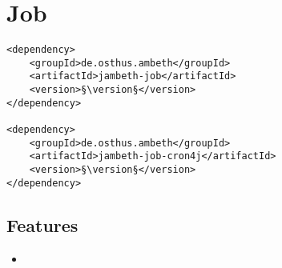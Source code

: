 \section{Job}
\label{module:Job}
\ClearAPI
\TODO
\begin{lstlisting}[style=POM,caption={Maven modules to use \emph{Ambeth Job}}]
<dependency>
	<groupId>de.osthus.ambeth</groupId>
	<artifactId>jambeth-job</artifactId>
	<version>§\version§</version>
</dependency>

<dependency>
	<groupId>de.osthus.ambeth</groupId>
	<artifactId>jambeth-job-cron4j</artifactId>
	<version>§\version§</version>
</dependency>
\end{lstlisting}
\subsection{Features}
\begin{itemize}
	\item {}
\end{itemize}

